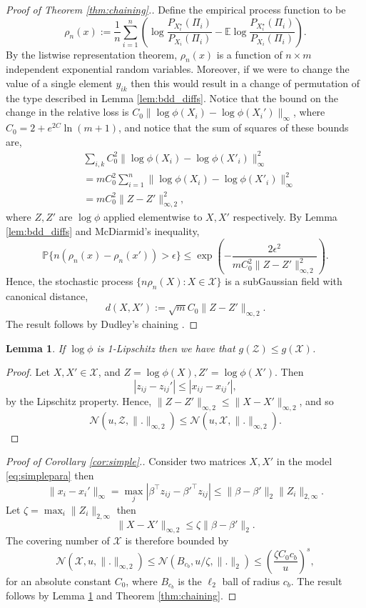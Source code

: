 \documentclass{article}
\newtheorem{lemma}{Lemma}
\begin{document}
\begin{proof}[Proof of Theorem \ref{thm:chaining}.]
Define the empirical process function to be
$$
\rho_n(x) := \frac 1n \sum_{i=1}^n \left( \log \frac{P_{X_i^\star}(\Pi_i)}{P_{X_i}(\Pi_i)} - \mathbb E \log \frac{P_{X_i^\star}(\Pi_i)}{P_{X_i}(\Pi_i)} \right).
$$
By the listwise representation theorem, $\rho_n(x)$ is a function of $n \times m$ independent exponential random variables.
Moreover, if we were to change the value of a single element $y_{ik}$ then this would result in a change of permutation of the type described in Lemma \ref{lem:bdd_diffs}.
Notice that the bound on the change in the relative loss is $C_0 \|\log \phi(X_i) - \log \phi(X_i') \|_\infty$, where $C_0 = 2 + e^{2C} \ln(m+1)$, and notice that the sum of squares of these bounds are,
\begin{align*}
&\sum_{i,k} C_0^2 \|\log \phi(X_i) - \log \phi(X'_i)\|^2_\infty \\
&= m C_0^2 \sum_{i=1}^n \| \log \phi(X_i) - \log \phi(X'_i) \|_\infty^2 \\
&= m C_0^2 \| Z - Z' \|_{\infty,2}^2,
\end{align*}
where $Z,Z'$ are $\log \phi$ applied elementwise to $X,X'$ respectively.
By Lemma \ref{lem:bdd_diffs} and McDiarmid's inequality,
$$
\mathbb P \{ n(\rho_n(x) - \rho_n(x')) > \epsilon \} \le \exp\left( - \frac{2 \epsilon^2}{m C_0^2 \| Z - Z'\|_{\infty,2}^2} \right).
$$
Hence, the stochastic process $\{ n \rho_n(X): X\in \mathcal X \}$ is a subGaussian field with canonical distance, 
$$
d(X,X') :=  \sqrt m C_0 \| Z - Z'\|_{\infty,2}.
$$
The result follows by Dudley's chaining \cite{talagrand2006generic}.
\end{proof}

\begin{lemma}
\label{lem:lipschitz}
If $\log \phi$ is 1-Lipschitz then we have that 
$g(\mathcal Z) \le g(\mathcal X)$.
\end{lemma}

\begin{proof}
Let $X,X' \in \mathcal X$, and $Z = \log \phi(X), Z' = \log \phi(X')$.
Then
$$
|z_{ij} - z_{ij}'| \le |x_{ij} - x_{ij}'|,
$$
by the Lipschitz property.
Hence, $\| Z - Z' \|_{\infty,2} \le \|X - X'\|_{\infty, 2}$, and so
$$
\mathcal N(u,\mathcal Z, \| . \|_{\infty,2}) \le \mathcal N(u,\mathcal X, \|.\|_{\infty,2}).
$$
\end{proof}

\begin{proof}[Proof of Corollary \ref{cor:simple}.]
Consider two matrices $X,X'$ in the model \eqref{eq:simplepara} then
$$
\| x_i - x_i' \|_\infty = \max_j |\beta^\top z_{ij} - \beta'^\top z_{ij}| \le \|\beta - \beta'\|_2 \|Z_i\|_{2,\infty }.
$$
Let $\zeta = \max_i \|Z_i\|_{2,\infty }$ then 
$$
\| X -X' \|_{\infty,2} \le \zeta \| \beta - \beta'\|_2.
$$
The covering number of $\mathcal X$ is therefore bounded by
$$
\mathcal N(\mathcal X, u, \| . \|_{\infty,2}) \le \mathcal N(B_{c_b},u/ \zeta,\|.\|_2) \le \left(\frac{\zeta C_0 c_b}{u}\right)^s,
$$
for an absolute constant $C_0$, where $B_{c_b}$ is the $\ell_2$ ball of radius $c_b$.
The result follows by Lemma \ref{lem:lipschitz} and Theorem \ref{thm:chaining}.
\end{proof}
\end{document}
